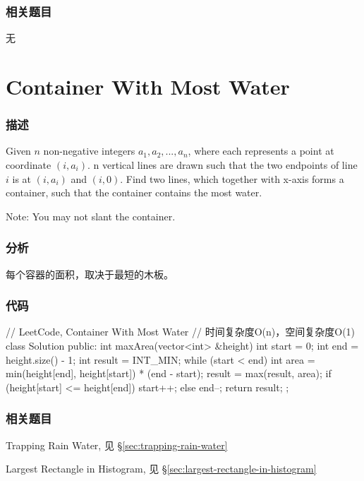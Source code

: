 \subsubsection{相关题目}
\begindot
\item 无
\myenddot


\section{Container With Most Water}
\label{sec:container-with-most-water}


\subsubsection{描述}
Given $n$ non-negative integers $a_1, a_2, ..., a_n$, where each represents a point at coordinate $(i, a_i)$. n vertical lines are drawn such that the two endpoints of line $i$ is at $(i, a_i)$ and $(i, 0)$. Find two lines, which together with x-axis forms a container, such that the container contains the most water.

Note: You may not slant the container.


\subsubsection{分析}
每个容器的面积，取决于最短的木板。


\subsubsection{代码}
\begin{Code}
// LeetCode, Container With Most Water
// 时间复杂度O(n)，空间复杂度O(1)
class Solution {
public:
    int maxArea(vector<int> &height) {
        int start = 0;
        int end = height.size() - 1;
        int result = INT_MIN;
        while (start < end) {
            int area = min(height[end], height[start]) * (end - start);
            result = max(result, area);
            if (height[start] <= height[end]) {
                start++;
            } else {
                end--;
            }
        }
        return result;
    }
};
\end{Code}


\subsubsection{相关题目}
\begindot
\item Trapping Rain Water, 见 \S \ref{sec:trapping-rain-water}
\item Largest Rectangle in Histogram, 见 \S \ref{sec:largest-rectangle-in-histogram}
\myenddot
